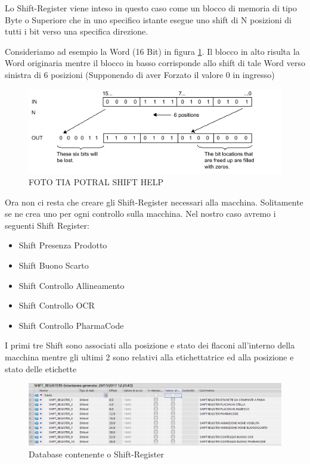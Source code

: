 \documentclass[12pt, a4paper, oneside]{book}
\begin{document}
Lo Shift-Register viene inteso in questo caso come un blocco di memoria di tipo Byte o Superiore che in uno specifico istante esegue uno shift di N posizioni di tutti i bit verso una specifica direzione.

Consideriamo ad esempio la Word (16 Bit) in figura \ref{sh1}. Il blocco in alto risulta la Word originaria mentre il blocco in basso corrisponde allo shift di tale Word verso sinistra di 6 posizioni (Supponendo di aver Forzato il valore 0 in ingresso)

\begin{figure}[H]
	\centering
	\includegraphics[width=12cm]{Immagini/SH1}
	\caption{ FOTO TIA POTRAL SHIFT HELP}
	\label{sh1}
\end{figure}

Ora non ci resta che creare gli Shift-Register necessari alla macchina. Solitamente se ne crea uno per ogni controllo sulla macchina. Nel nostro caso avremo i seguenti Shift Register:
\begin{itemize}
	\item Shift Presenza Prodotto
	\item Shift Buono Scarto
	\item Shift Controllo Allineamento
	\item Shift Controllo OCR
	\item Shift Controllo PharmaCode
\end{itemize}

I primi tre Shift sono associati alla posizione e stato dei flaconi all'interno della macchina mentre gli ultimi 2 sono relativi alla etichettatrice ed alla posizione e stato delle etichette

\begin{figure}[H]
	\centering
	\includegraphics[width=12cm]{Immagini/SH8}
	\caption{ Database contenente o Shift-Register}
	\label{sh8}
\end{figure}
\end{document}
